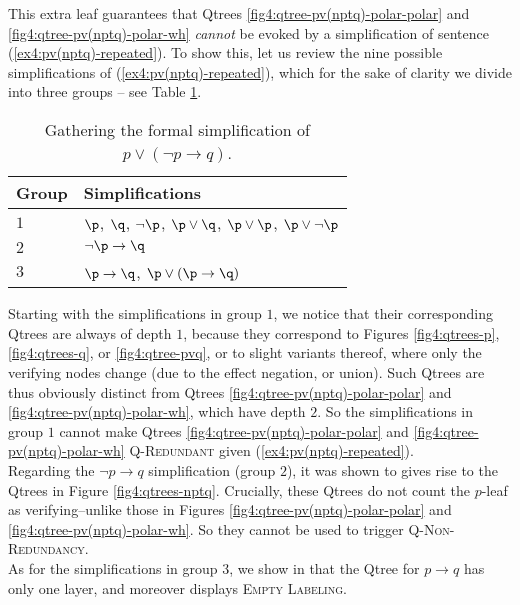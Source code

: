 This extra leaf guarantees that Qtrees \ref{fig4:qtree-pv(nptq)-polar-polar} and \ref{fig4:qtree-pv(nptq)-polar-wh} \textit{cannot} be evoked by a simplification of sentence (\ref{ex4:pv(nptq)-repeated}). To show this, let us review the nine possible simplifications of (\ref{ex4:pv(nptq)-repeated}), which for the sake of clarity we divide into three groups -- see Table \ref{tab4:pv(nptq)-simplifications}.

\begin{table}[H]
	\centering
	\begin{tabular}{ll}
		\toprule
		Group & Simplifications                                             \\ \midrule
		$1$     & $\p$, $\q$, $\neg \p$, $\p \vee \q$, $\p \vee \p$, $\p \vee \neg \p$ \\
		$2$     & $\neg \p \rightarrow \q$                                      \\
		$3$     & $\p \rightarrow \q$, $\p\vee (\p\rightarrow \q)$    \\ \bottomrule            
	\end{tabular}
	\caption[]{Gathering the formal simplification of $p \vee (\neg p \rightarrow q)$.}\label{tab4:pv(nptq)-simplifications}
\end{table}

Starting with the simplifications in group $1$, we notice that their corresponding Qtrees are always of depth $1$, because they correspond to Figures \ref{fig4:qtrees-p}, \ref{fig4:qtrees-q}, or \ref{fig4:qtree-pvq}, or to slight variants thereof, where only the verifying nodes change (due to the effect negation, or union). Such Qtrees are thus obviously distinct from Qtrees \ref{fig4:qtree-pv(nptq)-polar-polar} and \ref{fig4:qtree-pv(nptq)-polar-wh}, which have depth $2$. So the simplifications in group $1$ cannot make Qtrees \ref{fig4:qtree-pv(nptq)-polar-polar} and \ref{fig4:qtree-pv(nptq)-polar-wh} \textsc{Q-Redundant} given (\ref{ex4:pv(nptq)-repeated}).\\


Regarding the $\neg p \rightarrow q$ simplification (group $2$), it was shown to gives rise to the Qtrees in Figure \ref{fig4:qtrees-nptq}. Crucially, these Qtrees do not count the $p$-leaf as verifying--unlike those in Figures \ref{fig4:qtree-pv(nptq)-polar-polar} and \ref{fig4:qtree-pv(nptq)-polar-wh}. So they cannot be used to trigger \textsc{Q-Non-Redundancy}.\\

As for the simplifications in group $3$, we show in that the Qtree for $p \rightarrow q$ has only one layer, and moreover displays \textsc{Empty Labeling}.

